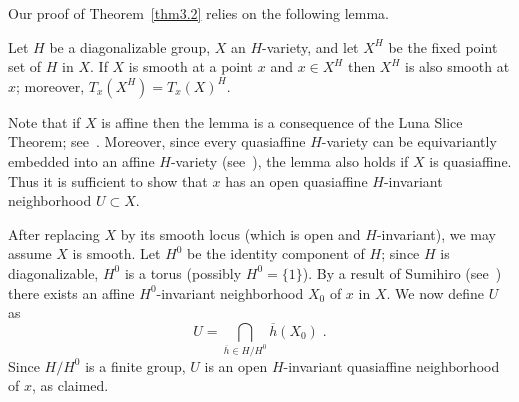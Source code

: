 Our proof of Theorem~\ref{thm3.2} relies on the following lemma.

\begin{lem} \label{linearization}
Let $H$ be a diagonalizable group, $X$ an $H$-variety, and let
$X^H$ be the fixed point set of $H$ in $X$. If $X$ is smooth at a point $x$
and $x \in X^H$ then $X^H$ is also smooth at $x$; moreover, $T_x(X^H) =
T_x(X)^H$.
\end{lem}

\begin{pf} Note that if $X$ is affine then the lemma is a consequence
of the Luna Slice Theorem; see~\cite[Corollary to Theorem~6.4]{pv}.
Moreover, since every
quasiaffine $H$-variety can be equivariantly embedded into an affine  
$H$-variety (see~\cite[Theorem 1.6]{pv}), the lemma also holds if $X$ 
is quasiaffine. Thus it is sufficient to show that $x$ has 
an open quasiaffine $H$-invariant neighborhood $U \subset X$.

After replacing $X$ by its smooth locus (which is open and $H$-invariant),
we may assume $X$ is smooth.
Let $H^0$ be the identity component of $H$; since $H$ is diagonalizable,
$H^0$ is a torus (possibly $H^0=\{1\}$).
By a result of Sumihiro (see~\cite[Corollary~2]{sumihiro})
there exists an affine
$H^0$-invariant neighborhood $X_0$ of $x$ in $X$. We now define $U$ as
\[ U = \bigcap_{\overline{h} \in H/H^0} \overline{h}(X_0) \; .\]
Since $H/H^0$ is a finite group, $U$ is an open $H$-invariant quasiaffine
neighborhood of $x$, as claimed.
\end{pf}

